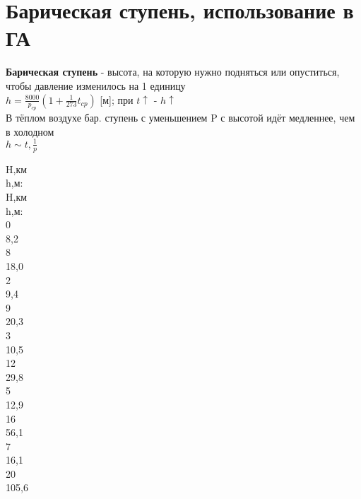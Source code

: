 
\section{Барическая ступень, использование в ГА}
\textbf{Барическая ступень} - высота, на которую нужно подняться или опуститься, чтобы давление изменилось на 1 единицу\\ 
$h=\frac{8000}{p_{cp}}(1+\frac{1}{273}t_{cp})$ [м]; при $t\uparrow$ - $h\uparrow$\\ 
В тёплом воздухе бар. ступень с уменьшением P с высотой идёт медленнее, чем в холодном \\ 
$h \sim t, \frac{1}{p}$ 

\begin{multicols*}{6} 
	H,км\\	h,м:\\ H,км\\	h,м:\\ 
	0\\ 8,2\\ 	8 \\ 18,0\\
	2\\9,4\\ 	9 \\ 20,3\\
	3 \\ 10,5\\ 12 \\ 29,8\\
	5 \\ 12,9\\ 16 \\ 56,1\\
	7 \\ 16,1\\ 20 \\ 105,6
\end{multicols*} 
